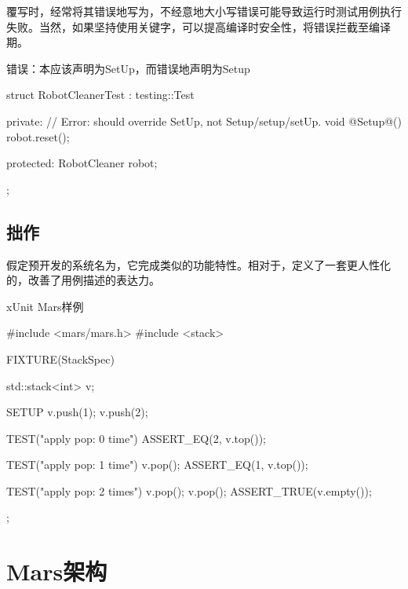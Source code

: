 \begin{content}
覆写时，经常将其错误地写为，不经意地大小写错误可能导致运行时测试用例执行失败。当然，如果坚持使用关键字，可以提高编译时安全性，将错误拦截至编译期。

\begin{nodiff}{错误：本应该声明为SetUp，而错误地声明为Setup}
 \begin{c++}
struct RobotCleanerTest : testing::Test {
private:
  // Error: should override SetUp, not Setup/setup/setUp.
  void @Setup@() {
    robot.reset();
  }
 
protected:
  RobotCleaner robot;
};
  \end{c++}
\end{nodiff}

\subsection{拙作}

假定预开发的系统名为，它完成类似的功能特性。相对于，定义了一套更人性化的，改善了用例描述的表达力。

\begin{enum}
\end{enum}

\begin{nodiff}{xUnit Mars样例}
 \begin{c++}
#include <mars/mars.h>
#include <stack>

FIXTURE(StackSpec) {
  std::stack<int> v;   

  SETUP {
    v.push(1);
    v.push(2);
  }

  TEST("apply pop: 0 time") {
    ASSERT_EQ(2, v.top());
  }

  TEST("apply pop: 1 time") {
    v.pop();
    ASSERT_EQ(1, v.top());
  }

  TEST("apply pop: 2 times") {
    v.pop();
    v.pop();
    ASSERT_TRUE(v.empty());
  }
}; 
 \end{c++}
\end{nodiff}

\end{content}

\section{Mars架构}
	
